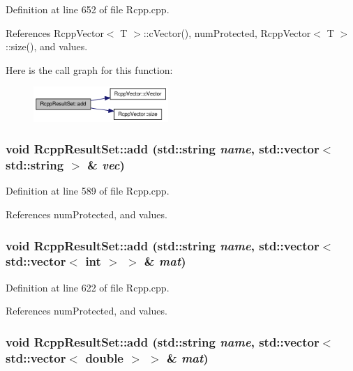 Definition at line 652 of file Rcpp.cpp.

References RcppVector$<$ T $>$::cVector(), numProtected, RcppVector$<$ T $>$::size(), and values.

Here is the call graph for this function:\nopagebreak
\begin{figure}[H]
\begin{center}
\leavevmode
\includegraphics[width=145pt]{classRcppResultSet_068cb13e27c0e26dd05e92d67eaeb7d0_cgraph}
\end{center}
\end{figure}
\hypertarget{classRcppResultSet_db4236a049c8dceb7112229f5e68a295}{
\subsubsection[{add}]{\setlength{\rightskip}{0pt plus 5cm}void RcppResultSet::add (std::string {\em name}, \/  std::vector$<$ std::string $>$ \& {\em vec})}}
\label{classRcppResultSet_db4236a049c8dceb7112229f5e68a295}




Definition at line 589 of file Rcpp.cpp.

References numProtected, and values.\hypertarget{classRcppResultSet_b51f30f4bd5f3c6153221a3bd7bb7e24}{
\subsubsection[{add}]{\setlength{\rightskip}{0pt plus 5cm}void RcppResultSet::add (std::string {\em name}, \/  std::vector$<$ std::vector$<$ int $>$ $>$ \& {\em mat})}}
\label{classRcppResultSet_b51f30f4bd5f3c6153221a3bd7bb7e24}




Definition at line 622 of file Rcpp.cpp.

References numProtected, and values.\hypertarget{classRcppResultSet_b10cd8503c12708e27068b92a83e4047}{
\subsubsection[{add}]{\setlength{\rightskip}{0pt plus 5cm}void RcppResultSet::add (std::string {\em name}, \/  std::vector$<$ std::vector$<$ double $>$ $>$ \& {\em mat})}}
\label{classRcppResultSet_b10cd8503c12708e27068b92a83e4047}




